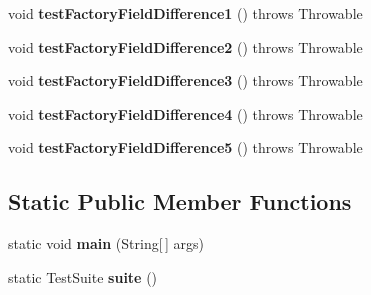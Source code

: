\begin{DoxyCompactItemize}
\item 
\hypertarget{classorg_1_1joda_1_1time_1_1_test_period___constructors_afe0c8d71b27db5e160325e696c7f2776}{void {\bfseries test\-Factory\-Field\-Difference1} ()  throws Throwable }\label{classorg_1_1joda_1_1time_1_1_test_period___constructors_afe0c8d71b27db5e160325e696c7f2776}

\item 
\hypertarget{classorg_1_1joda_1_1time_1_1_test_period___constructors_a880659057c8b9929d1f5ac59447a62db}{void {\bfseries test\-Factory\-Field\-Difference2} ()  throws Throwable }\label{classorg_1_1joda_1_1time_1_1_test_period___constructors_a880659057c8b9929d1f5ac59447a62db}

\item 
\hypertarget{classorg_1_1joda_1_1time_1_1_test_period___constructors_a9dfbd4735305d044aaed8afd71f5ff3a}{void {\bfseries test\-Factory\-Field\-Difference3} ()  throws Throwable }\label{classorg_1_1joda_1_1time_1_1_test_period___constructors_a9dfbd4735305d044aaed8afd71f5ff3a}

\item 
\hypertarget{classorg_1_1joda_1_1time_1_1_test_period___constructors_aba0b433858b934a9589f74ced8fc4aea}{void {\bfseries test\-Factory\-Field\-Difference4} ()  throws Throwable }\label{classorg_1_1joda_1_1time_1_1_test_period___constructors_aba0b433858b934a9589f74ced8fc4aea}

\item 
\hypertarget{classorg_1_1joda_1_1time_1_1_test_period___constructors_a03b1b8e19c887e1d3d955c4280d2f366}{void {\bfseries test\-Factory\-Field\-Difference5} ()  throws Throwable }\label{classorg_1_1joda_1_1time_1_1_test_period___constructors_a03b1b8e19c887e1d3d955c4280d2f366}

\end{DoxyCompactItemize}
\subsection*{Static Public Member Functions}
\begin{DoxyCompactItemize}
\item 
\hypertarget{classorg_1_1joda_1_1time_1_1_test_period___constructors_a145ea72283df10cc7029b330ecc4a187}{static void {\bfseries main} (String\mbox{[}$\,$\mbox{]} args)}\label{classorg_1_1joda_1_1time_1_1_test_period___constructors_a145ea72283df10cc7029b330ecc4a187}

\item 
\hypertarget{classorg_1_1joda_1_1time_1_1_test_period___constructors_a8a7df9e0f0b04ee2db581cbc7d708fbb}{static Test\-Suite {\bfseries suite} ()}\label{classorg_1_1joda_1_1time_1_1_test_period___constructors_a8a7df9e0f0b04ee2db581cbc7d708fbb}

\end{DoxyCompactItemize}
